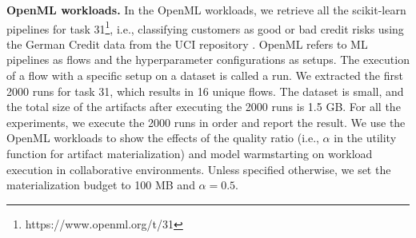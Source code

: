 \textbf{OpenML workloads.} In the OpenML workloads, we retrieve all the scikit-learn pipelines for task 31\footnote{https://www.openml.org/t/31}, i.e., classifying customers as good or bad credit risks using the German Credit data from the UCI repository \cite{asuncion2007uci}.
OpenML refers to ML pipelines as flows and the hyperparameter configurations as setups.
The execution of a flow with a specific setup on a dataset is called a run.
We extracted the first 2000 runs for task 31, which results in 16 unique flows. 
The dataset is small, and the total size of the artifacts after executing the 2000 runs is 1.5 GB.
For all the experiments, we execute the 2000 runs in order and report the result.
We use the OpenML workloads to show the effects of the quality ratio (i.e., $\alpha$ in the utility function for artifact materialization) and model warmstarting on workload execution in collaborative environments.
Unless specified otherwise, we set the materialization budget to 100 MB and $\alpha=0.5$.

